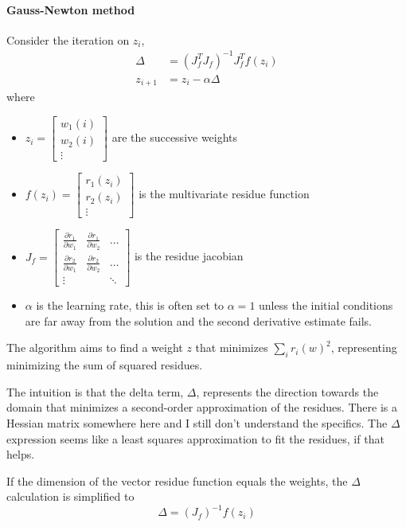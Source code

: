 \documentclass[11pt]{article}
\begin{document}
\paragraph{Gauss-Newton method}
Consider the iteration on $z_i$,
\begin{align*}
	\Delta &= (J_f^T J_f)^{-1} J_f^T f(z_i)\\
	z_{i+1} &= z_i - \alpha \Delta
\end{align*}
where
\begin{itemize}
	\item $z_i = \begin{bmatrix}
		w_1(i)\\
		w_2(i)\\
		\vdots
	\end{bmatrix}$ are the successive weights
	\item $f(z_i) = \begin{bmatrix}
		r_1(z_i)\\
		r_2(z_i)\\
		\vdots
	\end{bmatrix}$ is the multivariate residue function
	\item $J_f = \begin{bmatrix}
		\frac{\partial r_1}{\partial w_1} & \frac{\partial r_1}{\partial w_2} & \dots \\
		\frac{\partial r_2}{\partial w_1} & \frac{\partial r_2}{\partial w_2} & \dots \\
		\vdots & & \ddots
	\end{bmatrix}$ is the residue jacobian
	\item $\alpha$ is the learning rate, this is often set to $\alpha=1$ unless the initial conditions are far away from the solution and the second derivative estimate fails.
\end{itemize}

The algorithm aims to find a weight $z$ that minimizes $\sum_i r_i(w)^2$, representing minimizing the sum of squared residues.

The intuition is that the delta term, $\Delta$, represents the direction towards the domain that minimizes a second-order approximation of the residues. There is a Hessian matrix somewhere here and I still don't understand the specifics. The $\Delta$ expression seems like a least squares approximation to fit the residues, if that helps.

If the dimension of the vector residue function equals the weights, the $\Delta$ calculation is simplified to
\[
	\Delta = (J_f)^{-1} f(z_i)
\]
\end{document}
